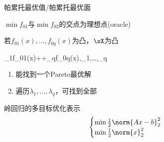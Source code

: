 帕累托最优值/帕累托最优面

$\min f_{01}$与$\min f_{02}$的交点为理想点(oracle)

若$f_{01}(x),\ldots,f_{0q}(x)$为凸，$\sX$为凸
\begin{mini*}[2]
{}{\lambda_1f_{01}(x)+\cdots+\lambda_qf_{0q}(x),\quad\lambda_1,\ldots,\lambda_q}{}{}
\end{mini*}
\begin{enumerate}
	\item 能找到一个Pareto最优解
	\item 遍历$\lambda_1,\ldots,\lambda_q$，可找到全部
\end{enumerate}

岭回归的多目标优化表示
\[\begin{cases}
	\min \frac{1}{2}\norm{Ax-b}_2^2\\
	\min \frac{1}{2}\norm{x}_2^2
\end{cases}\]